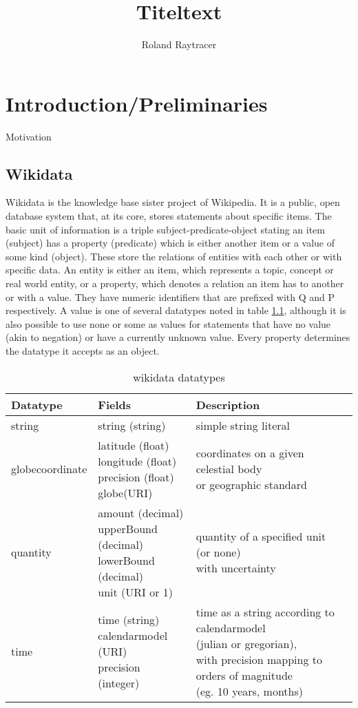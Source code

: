 \documentclass[hyperref,bachelorofscience]{cgvpub}
\author{Roland Raytracer}
\title{Titeltext}
\begin{document}
\chapter{Introduction/Preliminaries}
Motivation
\newpage
\section{Wikidata}
Wikidata is the knowledge base sister project of Wikipedia. It is a public, open database system that, at its core, stores statements about specific items. The basic unit of information is a triple subject-predicate-object stating an item (subject) has a property (predicate) which is either another item or a value of some kind (object). These store the relations of entities with each other or with specific data. An entity is either an item, which represents a topic, concept or real world entity, or a property, which denotes a relation an item has to another or with a value. They have numeric identifiers that are prefixed with Q and P respectively. A value is one of several datatypes noted in table \ref{tab_datatypes}, although it is also possible to use none or some as values for statements that have no value (akin to negation) or have a currently unknown value. Every property determines the datatype it accepts as an object. \\

\begin{table}[H]
\caption{wikidata datatypes}\label{tab_datatypes}
\begin{tabularx}{\textwidth}{lllX}
Datatype & Fields & Description \\
\hline
string & string (string) & simple string literal \\
globecoordinate & \makecell{latitude (float) \\ longitude (float) \\ precision (float) \\ globe(URI)} & \makecell{coordinates on a given celestial body \\ or geographic standard} \\
quantity & \makecell {amount (decimal) \\ upperBound (decimal) \\ lowerBound (decimal) \\ unit (URI or 1)} & \makecell{quantity of a specified unit (or none) \\ with uncertainty} \\
time & \makecell {time (string) \\ calendarmodel (URI) \\ precision (integer)} & \makecell {time as a string according to calendarmodel \\ (julian or gregorian),\\ with precision mapping to orders of magnitude \\ (eg. 10 years, months)} \\


\end{tabularx}
\end{table}
\end{document}

